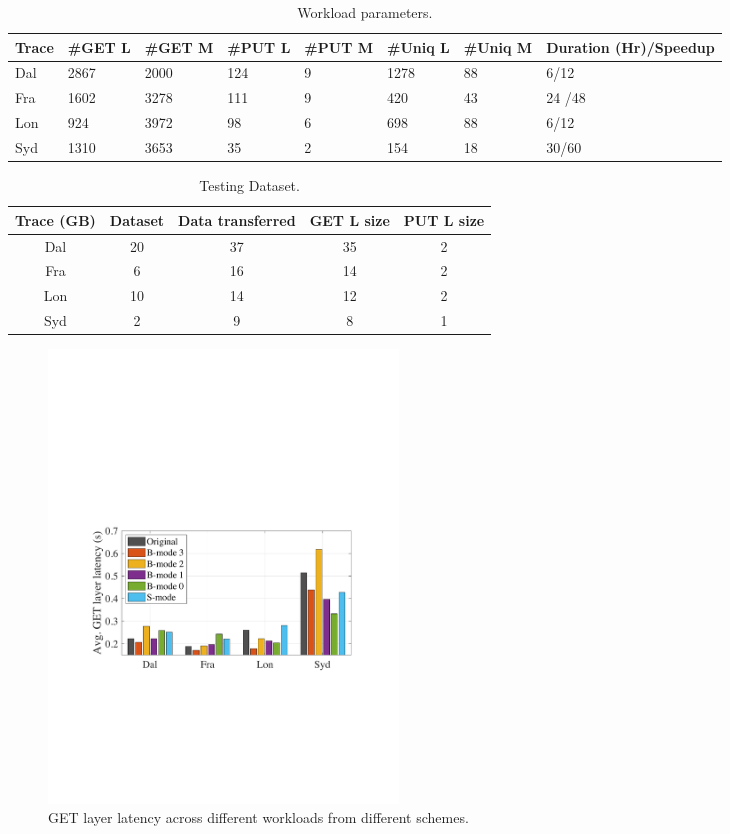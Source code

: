 
\begin{table}[h!]
	\scriptsize
	\caption{Workload parameters.}
	\begin{tabular}{| p{0.38cm} | p{0.5cm} | p{0.5cm} | p{0.5cm} | p{0.5cm}| p{0.5cm}| p{0.5cm}| p{1.25cm} |} 
		\hline
	Trace    &   \#GET L & \#GET M & \#PUT L & \#PUT M & \#Uniq L & \#Uniq M & Duration (Hr)/Speedup \\ 
		\hline\hline
		Dal    &  2867  & 2000   & 124  & 9     & 1278 & 88  & 6/12    \\ 
		\hline
		Fra     &  1602  & 3278   & 111  & 9     & 420 & 43  & 24 /48   \\
		\hline
		Lon    &  924    & 3972   & 98  & 6      & 698 & 88  & 6/12    \\
		\hline 
		Syd      &  1310   & 3653   & 35 & 2     & 154 & 18  & 30/60    \\  
		\hline
	\end{tabular}

\label{tab:eval-overall}
\end{table}


\begin{table}[h!]
	\scriptsize 
	\caption{Testing Dataset.}
	\begin{tabular}{| c | c | c | c | c | } 
		\hline
		Trace  (GB)  &   Dataset  & Data transferred  & GET L size  & PUT L size  \\ 
		\hline\hline
		Dal   & 20  & 37 & 35 & 2    \\ 
		\hline
		Fra     & 6  & 16 & 14 & 2   \\
		\hline
		Lon    &10   &  14 &12  & 2      \\
		\hline 
		Syd      &  2  &  9 & 8 & 1      \\  
		\hline
	\end{tabular}
	
	\label{tab:eval-dataset}
\end{table}


\begin{figure}[t]
	\centering
	\includegraphics[width=0.45\textwidth]{graphs/get-layer-latency.pdf}
	\caption{GET layer latency across different workloads from different schemes.}
	\label{fig:getlayerlatency}
	
\end{figure}

